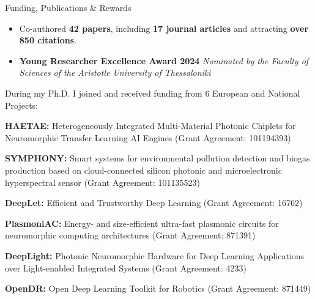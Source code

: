 \begin{frame}{Funding, Publications \& Rewards}
\begin{itemize}
    \item Co-authored \textbf{42 papers}, including \textbf{17 journal articles} and attracting \textbf{over 850 citations}.
    \item \textbf{Young Researcher Excellence Award 2024} \textit{Nominated by the Faculty of Sciences of the Aristotle University of Thessaloniki} 
\end{itemize}
    During my Ph.D. I joined and received funding from 6 European and National Projects:
\begin{enumerate}
  \scriptsize{\item \textbf{HAETAE:} Heterogeneously Integrated Multi-Material Photonic
    Chiplets for Neuromorphic Transfer Learning AI Engines (Grant Agreement: 101194393)} 
  \item \scriptsize{\textbf{SYMPHONY:} Smart systems for environmental pollution detection
    and biogas production based on cloud-connected silicon photonic and
    microelectronic hyperspectral sensor (Grant Agreement: 101135523)}
  \item \scriptsize{\textbf{DeepLet:} Efficient and Trustworthy Deep Learning (Grant
    Agreement: 16762)}
  \item \scriptsize{\textbf{PlasmoniAC:} Energy- and size-efficient ultra-fast plasmonic circuits for
    neuromorphic computing architectures (Grant Agreement: 871391)}
  \item \scriptsize{\textbf{DeepLight:} Photonic Neuromorphic Hardware for Deep Learning
    Applications over Light-enabled Integrated Systems (Grant Agreement: 4233)}
  \item \scriptsize{\textbf{OpenDR:} Open Deep Learning Toolkit for Robotics (Grant
    Agreement: 871449)}
  \end{enumerate}
\end{frame}


